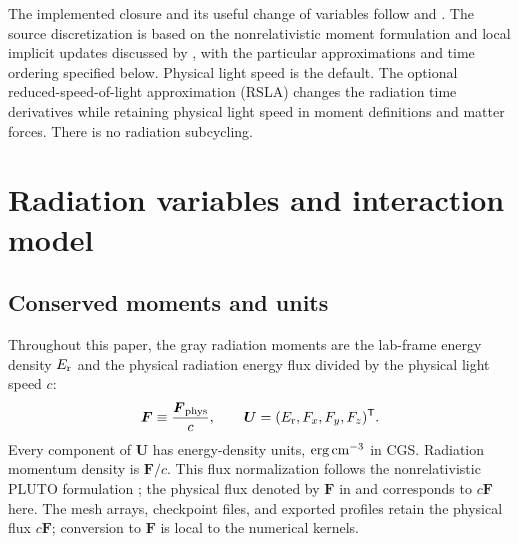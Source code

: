 \documentclass[manuscript]{aastex7}
\newcommand{\vct}[1]{\boldsymbol{#1}}
\newcommand{\Er}{E_{\rm r}}
\newcommand{\Fr}{\vct{F}}
\begin{document}
The implemented closure and its useful change of variables follow
\citet{Levermore1984} and \citet{HanawaAudit2014}. The source discretization is
based on the nonrelativistic moment formulation and local implicit updates
discussed by \citet{SkinnerOstriker2013}, with the particular approximations
and time ordering specified below. Physical light speed is the default.
The optional reduced-speed-of-light approximation (RSLA) changes the
radiation time derivatives while retaining physical light speed in
moment definitions and matter forces. There is no radiation subcycling.

\section{Radiation variables and interaction model}
\subsection{Conserved moments and units}
Throughout this paper, the gray radiation moments are the lab-frame energy
density $\Er$ and the physical radiation energy flux divided by the physical
light speed $c$:
\begin{equation}
  \Fr\equiv\frac{\vct{F}_{\rm phys}}{c},\qquad
  \vct{U}=(\Er,F_x,F_y,F_z)^{\mathsf T}.
  \label{eq:state}
\end{equation}
Every component of $\vct{U}$ has energy-density units,
${\rm erg\,cm^{-3}}$ in CGS. Radiation momentum density is $\Fr/c$.
This flux normalization follows the nonrelativistic PLUTO formulation
\citep{MelonFuksman2021}; the physical flux denoted by $\vct{F}$ in
\citet{HanawaAudit2014} and \citet{SkinnerOstriker2013} corresponds to
$c\Fr$ here. The mesh arrays, checkpoint files, and exported profiles
retain the physical flux $c\Fr$; conversion to $\Fr$ is local to the
numerical kernels.
\end{document}
